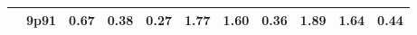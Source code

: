 \documentclass[12pt,A4paper]{article}
\begin{document}
\begin{table}[]
\begin{tabular}{lllllllllll}
\multicolumn{1}{|l|}{} & \multicolumn{1}{l|}{9p91} & \multicolumn{1}{c|}{0.67}        & \multicolumn{1}{c|}{0.38}         & \multicolumn{1}{c|}{0.27}        & \multicolumn{1}{c|}{1.77}         & \multicolumn{1}{c|}{1.60}        & \multicolumn{1}{c|}{0.36}        & \multicolumn{1}{c|}{1.89}        & \multicolumn{1}{c|}{1.64}        & \multicolumn{1}{c|}{0.44}         \\ \hline

\end{tabular}
\end{table}
\end{document}
